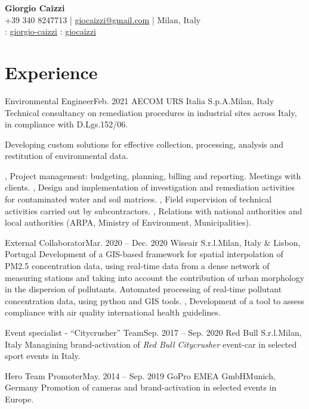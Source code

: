 \documentclass[letterpaper,11pt]{article}
\begin{document}
\begin{center}
  \textbf{\Huge \bfseries Giorgio Caizzi} \\
  \vspace{3pt}
  \small +39 340 8247713 | \href{mailto:giocaizzi@gmail.com}{\underline{giocaizzi@gmail.com}}
  | Milan, Italy\\
  \vspace{3pt}
  \faLinkedinSquare{} : \href{https://linkedin.com/in/giorgio-caizzi/}{\underline{giorgio-caizzi}}
  \faGithubSquare{} : \href{https://www.github.com/giocaizzi/}{\underline{giocaizzi}}\\
\end{center}
\vspace{-30pt}

\section{Experience}

\begin{sectionElementsList}
  \experienceElement
  {Environmental Engineer}{Feb. 2021}
  {AECOM URS Italia S.p.A.}{Milan, Italy}
  {
    Technical consultancy on remediation procedures in industrial sites across Italy, in compliance with D.Lgs.152/06.
  }{

    {
        Developing custom solutions for effective collection, processing, analysis and restitution of environmental data.

      },
    {
        Project management: budgeting, planning, billing and reporting. Meetings with clients.
      },
    {
        Design and implementation of investigation and remediation activities for contaminated water and soil matrices.
      },
    {
        Field supervision of technical activities carried out by subcontractors.
      },
    {
        Relations with national authorities and local authorities  (ARPA, Ministry of Environment, Municipalities).
      }
  }
  \experienceElement
  {External Collaborator}{Mar. 2020 -- Dec. 2020}
  {Wiseair S.r.l.}{Milan, Italy \& Lisbon, Portugal}
  {
    Development of a GIS-based framework for spatial interpolation of PM2.5 concentration
    data, using real-time data from a dense network of measuring stations and taking into account the contribution of
    urban morphology in the dispersion of pollutants.
  }
  {
    {
        Automated processing of real-time pollutant concentration data, using python and GIS tools.
      },
    {
        Development of a tool to assess compliance with air quality international health guidelines.
      }
  }

  \experienceElement
  {Event specialist - “Citycrusher” Team}{Sep. 2017 -- Sep. 2020}
  {Red Bull S.r.l.}{Milan, Italy}
  {Managining brand-activation of \textit{Red Bull Citycrusher} event-car in selected sport
    events in Italy.}
  {}

  \experienceElement
  {Hero Team Promoter}{May. 2014 -- Sep. 2019}
  {GoPro EMEA GmbH}{Munich, Germany}
  {Promotion of cameras and brand-activation in selected events in Europe.}
  {}
\end{sectionElementsList}
\end{document}
